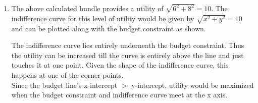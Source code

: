\documentclass{article}
\begin{document}
\begin{enumerate}
\begin{enumerate}[label=(\roman*)]
                Substituting this into the budget constraint $3x+4y=50$, we get $y=8$ and $x=6$\\
                $\therefore$ (6,8) is the optimal consumption bundle.
            \item 
                The above calculated bundle provides a utility of $\sqrt{6^2+8^2} = 10$. The indifference curve for this level of utility would be given by $\sqrt{x^2+y^2} =10$ and can be plotted along with the budget constraint as shown. 
                \begin{center}
                \end{center}
                The indifference curve lies entirely underneath the budget constraint. Thus the utility can be increased till the curve is entirely above the line and just touches it at one point. Given the shape of the indifference curve, this happens at one of the corner points.\\
                Since the budget line's x-intercept $>$ y-intercept, utility would be maximized when the budget constraint and indifference curve meet at the x axis.\\
                \begin{minipage}{0.49\textwidth}
\end{minipage}
\end{enumerate}
\end{enumerate}
\end{document}
